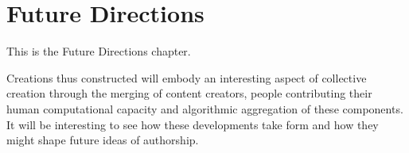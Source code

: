 \chapter{Future Directions}
\label{ch:future}

This is the Future Directions chapter.


Creations thus constructed will embody an interesting aspect of collective creation through the merging of content creators, people contributing their human computational capacity and algorithmic aggregation of these components. It will be interesting to see how these developments take form and how they might shape future ideas of authorship.
